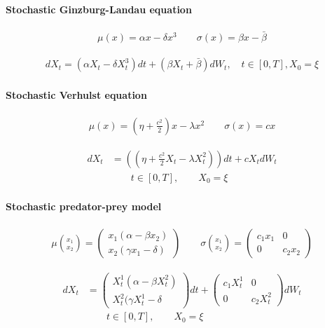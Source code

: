 \documentclass[a4paper,landscape,7pt,fleqn]{scrartcl}
\begin{document}
\begin{multicols*}{3}
\paragraph{Stochastic Ginzburg-Landau equation}

\begin{align*}
\mu(x) = \alpha x - \delta x^3 \qquad \sigma(x) = \beta x - \bar \beta
\end{align*}

\begin{align*}
dX_t = (\alpha X_t - \delta X_t^3) dt + (\beta X_t + \bar \beta) dW_t, \quad t \in [0,T], X_0 = \xi
\end{align*}

\paragraph{Stochastic Verhulst equation}

\begin{align*}
\mu(x) = (\eta + \frac{c^2}{2}) x - \lambda x^2 \qquad \sigma(x) = c x
\end{align*}

\begin{align*}
dX_t &= \left( \left( \eta + \frac{c^2}{2} X_t - \lambda X_t^2 \right) \right) dt + c X_t dW_t \\
& \qquad t \in [0,T], \qquad X_0 = \xi
\end{align*}

\paragraph{Stochastic predator-prey model}

\begin{align*}
\mu \binom{x_1}{x_2} = \begin{pmatrix}
x_1 (\alpha - \beta x_2) \\ x_2 (\gamma x_1 - \delta)
\end{pmatrix} \qquad
\sigma \binom{x_1}{x_2} = \begin{pmatrix}
c_1 x_1 & 0 \\ 0 & c_2 x_2
\end{pmatrix}
\end{align*}

\begin{align*}
dX_t &= \begin{pmatrix}
X_t^1 (\alpha - \beta X_t^2) \\ X_t^2 (\gamma X_t^1 - \delta
\end{pmatrix} dt +
\begin{pmatrix}
c_1 X_t^1 & 0 \\ 0 & c_2 X_t^2
\end{pmatrix} dW_t \\
& \qquad t \in [0,T], \qquad X_0 = \xi
\end{align*}


\end{multicols*}
\end{document}
